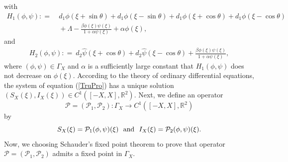 \documentclass[final,3p,times]{elsarticle}
\numberwithin{equation}{section}
\begin{document}
with
\begin{align*}
H_1(\phi,\psi) : = &\ d_{1}\phi(\xi + \sin\theta) + d_{1}\phi(\xi - \sin\theta) + d_{1}\phi(\xi + \cos\theta) + d_{1}\phi(\xi - \cos\theta)\\
 &\ + \Lambda - \frac{\beta \phi(\xi)\psi(\xi)}{1+\alpha \psi(\xi)} + \alpha\phi(\xi), 
\end{align*}
and
\begin{align*}
H_2(\phi,\psi) : =\ d_{2}\hat{\psi}(\xi + \cos\theta) + d_{2}\hat{\psi}(\xi - \cos\theta)+ \frac{\beta \phi(\xi)\psi(\xi)}{1+\alpha \psi(\xi)},
\end{align*}
where $(\phi,\psi)\in \Gamma_X$ and $\alpha$ is a sufficiently large constant that $H_1(\phi,\psi)$ does not decrease on $\phi(\xi)$. According to the theory of ordinary differential equations, the system of equation (\ref{TruPro}) has a unique solution $(S_X(\xi),I_X(\xi))\in C^1([-X,X],\mathbb{R}^2)$. Next, we define an operator
\[
\mathcal{P} = (\mathcal{P}_1,\mathcal{P}_2):\Gamma_X\rightarrow C^1\left([-X,X],\mathbb{R}^2\right)
\]
by
\[
S_X(\xi)=\mathcal{P}_1(\phi,\psi)(\xi)\ \ {\rm and}\ \ I_X(\xi)=\mathcal{P}_2(\phi,\psi)(\xi).
\]
Now, we choosing Schauder's fixed point theorem to prove that operator $\mathcal{P}=(\mathcal{P}_1,\mathcal{P}_2)$ admits a fixed point in $\Gamma_X$.
\end{document}
